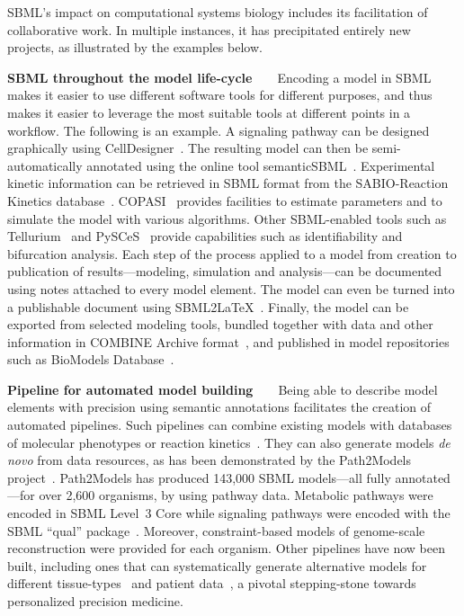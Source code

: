 \documentclass[]{draft-sbml-paper}
\begin{document}
SBML's impact on computational systems biology includes its facilitation of collaborative work.  In multiple instances, it has precipitated entirely new projects, as illustrated by the examples below.

\textbf{SBML throughout the model life-cycle}~~~~Encoding a model in SBML makes it easier to use different software tools for different purposes, and thus makes it easier to leverage the most suitable tools at different points in a workflow.  The following is an example.  A signaling pathway can be designed graphically using CellDesigner~\citep{Funahashi2003celldesignera, Matsuoka2014modeling}. The resulting model can then be semi-automatically annotated using the online tool semanticSBML~\citep{krause2010annotation}. Experimental kinetic information can be retrieved in SBML format from the SABIO-Reaction Kinetics database~\citep{wittig2017sabio}. COPASI~\citep{hoops2006copasi} provides facilities to estimate parameters and to simulate the model with various algorithms. Other SBML-enabled tools such as Tellurium~\citep{Medley2018tellurium, Choi2018tellurium} and PySCeS~\citep{olivier2005modelling} provide capabilities such as identifiability and bifurcation analysis. Each step of the process applied to a model from creation to publication of results---modeling, simulation and analysis---can be documented using notes attached to every model element. The model can even be turned into a publishable document using SBML2\LaTeX~\citep{Draeger2009b}.  Finally, the model can be exported from selected modeling tools, bundled together with data and other information in COMBINE Archive format~\citep{bergmann2014combine}, and published in model repositories such as BioModels Database~\citep{chelliah2014biomodels, li2010biomodels}.

\textbf{Pipeline for automated model building}~~~~Being able to describe model elements with precision using semantic annotations facilitates the creation of automated pipelines. Such pipelines can combine existing models with databases of molecular phenotypes or reaction kinetics~\citep{li2010systematic}.  They can also generate models \emph{de novo} from data resources, as has been demonstrated by the Path2Models project~\citep{buchel2013path2models}. Path2Models has produced 143,000 SBML models---all fully annotated---for over 2,600 organisms, by using pathway data. Metabolic pathways were encoded in SBML Level~3 Core while signaling pathways were encoded with the SBML ``qual'' package~\citep{chaouiya2013sbml}. Moreover, constraint-based models of genome-scale reconstruction were provided for each organism. Other pipelines have now been built, including ones that can systematically generate alternative models for different tissue-types~\citep{wang2012reconstruction,thiele2013community} and patient data~\citep{uhlen2017pathology}, a pivotal stepping-stone towards personalized precision medicine.
\end{document}
